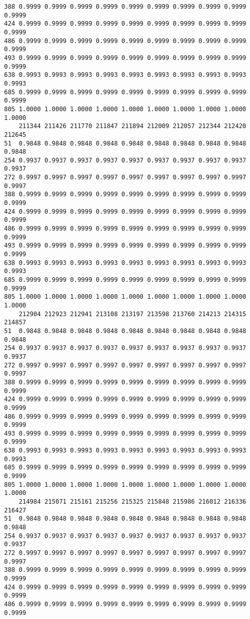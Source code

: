 \documentclass[
]{report}
\begin{document}
\begin{verbatim}
388 0.9999 0.9999 0.9999 0.9999 0.9999 0.9999 0.9999 0.9999 0.9999 0.9999
424 0.9999 0.9999 0.9999 0.9999 0.9999 0.9999 0.9999 0.9999 0.9999 0.9999
486 0.9999 0.9999 0.9999 0.9999 0.9999 0.9999 0.9999 0.9999 0.9999 0.9999
493 0.9999 0.9999 0.9999 0.9999 0.9999 0.9999 0.9999 0.9999 0.9999 0.9999
638 0.9993 0.9993 0.9993 0.9993 0.9993 0.9993 0.9993 0.9993 0.9993 0.9993
685 0.9999 0.9999 0.9999 0.9999 0.9999 0.9999 0.9999 0.9999 0.9999 0.9999
805 1.0000 1.0000 1.0000 1.0000 1.0000 1.0000 1.0000 1.0000 1.0000 1.0000
    211344 211426 211770 211847 211894 212009 212057 212344 212420 212645
51  0.9848 0.9848 0.9848 0.9848 0.9848 0.9848 0.9848 0.9848 0.9848 0.9848
254 0.9937 0.9937 0.9937 0.9937 0.9937 0.9937 0.9937 0.9937 0.9937 0.9937
272 0.9997 0.9997 0.9997 0.9997 0.9997 0.9997 0.9997 0.9997 0.9997 0.9997
388 0.9999 0.9999 0.9999 0.9999 0.9999 0.9999 0.9999 0.9999 0.9999 0.9999
424 0.9999 0.9999 0.9999 0.9999 0.9999 0.9999 0.9999 0.9999 0.9999 0.9999
486 0.9999 0.9999 0.9999 0.9999 0.9999 0.9999 0.9999 0.9999 0.9999 0.9999
493 0.9999 0.9999 0.9999 0.9999 0.9999 0.9999 0.9999 0.9999 0.9999 0.9999
638 0.9993 0.9993 0.9993 0.9993 0.9993 0.9993 0.9993 0.9993 0.9993 0.9993
685 0.9999 0.9999 0.9999 0.9999 0.9999 0.9999 0.9999 0.9999 0.9999 0.9999
805 1.0000 1.0000 1.0000 1.0000 1.0000 1.0000 1.0000 1.0000 1.0000 1.0000
    212904 212923 212941 213108 213197 213598 213760 214213 214315 214857
51  0.9848 0.9848 0.9848 0.9848 0.9848 0.9848 0.9848 0.9848 0.9848 0.9848
254 0.9937 0.9937 0.9937 0.9937 0.9937 0.9937 0.9937 0.9937 0.9937 0.9937
272 0.9997 0.9997 0.9997 0.9997 0.9997 0.9997 0.9997 0.9997 0.9997 0.9997
388 0.9999 0.9999 0.9999 0.9999 0.9999 0.9999 0.9999 0.9999 0.9999 0.9999
424 0.9999 0.9999 0.9999 0.9999 0.9999 0.9999 0.9999 0.9999 0.9999 0.9999
486 0.9999 0.9999 0.9999 0.9999 0.9999 0.9999 0.9999 0.9999 0.9999 0.9999
493 0.9999 0.9999 0.9999 0.9999 0.9999 0.9999 0.9999 0.9999 0.9999 0.9999
638 0.9993 0.9993 0.9993 0.9993 0.9993 0.9993 0.9993 0.9993 0.9993 0.9993
685 0.9999 0.9999 0.9999 0.9999 0.9999 0.9999 0.9999 0.9999 0.9999 0.9999
805 1.0000 1.0000 1.0000 1.0000 1.0000 1.0000 1.0000 1.0000 1.0000 1.0000
    214984 215071 215161 215256 215325 215848 215986 216012 216336 216427
51  0.9848 0.9848 0.9848 0.9848 0.9848 0.9848 0.9848 0.9848 0.9848 0.9848
254 0.9937 0.9937 0.9937 0.9937 0.9937 0.9937 0.9937 0.9937 0.9937 0.9937
272 0.9997 0.9997 0.9997 0.9997 0.9997 0.9997 0.9997 0.9997 0.9997 0.9997
388 0.9999 0.9999 0.9999 0.9999 0.9999 0.9999 0.9999 0.9999 0.9999 0.9999
424 0.9999 0.9999 0.9999 0.9999 0.9999 0.9999 0.9999 0.9999 0.9999 0.9999
486 0.9999 0.9999 0.9999 0.9999 0.9999 0.9999 0.9999 0.9999 0.9999 0.9999

\end{verbatim}
\end{document}
